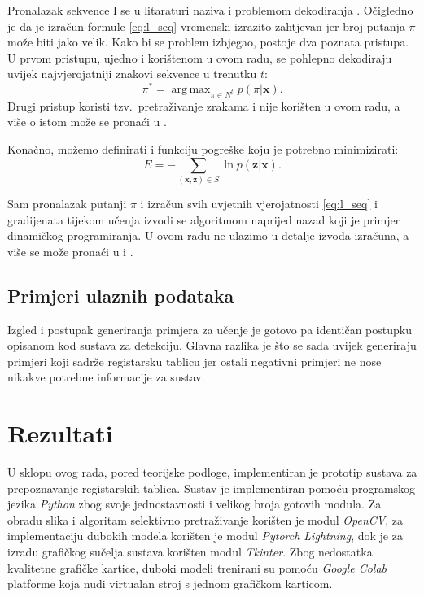 \documentclass[times, utf8, diplomski]{fer}
\DeclareMathOperator*{\argmax}{arg\,max}
\begin{document}
Pronalazak sekvence $\pmb{\mathbf{l}}$ se u litaraturi \citep{ctc-paper} naziva i problemom dekodiranja . Očigledno je da je izračun formule \ref{eq:l_seq} vremenski izrazito zahtjevan jer broj putanja $\pi$ može biti jako velik. Kako bi se problem izbjegao, postoje dva poznata pristupa. U prvom pristupu, ujedno i korištenom u ovom radu, se pohlepno dekodiraju uvijek najvjerojatniji znakovi sekvence  u trenutku $t$:
\begin{equation}
    \pi^* = \argmax_{\pi \in N^t}p(\pi | \pmb{\mathbf{x}}).
\end{equation}
Drugi pristup koristi tzv.\ pretraživanje zrakama  i nije korišten u ovom radu, a više o istom može se pronaći u \citep{ctc-paper}.

Konačno, možemo definirati i funkciju pogreške koju je potrebno minimizirati:
\begin{equation}
    E = - \sum_{(\pmb{\mathbf{x}}, \pmb{\mathbf{z}}) \in S} \ln p(\pmb{\mathbf{z}}|\pmb{\mathbf{x}}).
\end{equation}

Sam pronalazak putanji $\pi$ i izračun svih uvjetnih vjerojatnosti \ref{eq:l_seq} i gradijenata tijekom učenja izvodi se algoritmom naprijed nazad  koji je primjer dinamičkog programiranja. U ovom radu ne ulazimo u detalje izvoda izračuna, a više se može pronaći u \citep{ctc-paper} i \citep{crnn-paper}. 

\section{Primjeri ulaznih podataka}
Izgled i postupak generiranja primjera za učenje je gotovo pa identičan postupku opisanom kod sustava za detekciju. Glavna razlika je što se sada uvijek generiraju primjeri koji sadrže registarsku tablicu jer ostali negativni primjeri ne nose nikakve potrebne informacije za sustav.


\chapter{Rezultati}
U sklopu ovog rada, pored teorijske podloge, implementiran je prototip sustava za prepoznavanje registarskih tablica. Sustav je implementiran pomoću programskog jezika \textit{Python} zbog svoje jednostavnosti i velikog broja gotovih modula. Za obradu slika i algoritam selektivno pretraživanje korišten je modul \textit{OpenCV}, za implementaciju dubokih modela korišten je modul \textit{Pytorch Lightning}, dok je za izradu grafičkog sučelja sustava korišten modul \textit{Tkinter}. Zbog nedostatka kvalitetne grafičke kartice, duboki modeli trenirani su pomoću \textit{Google Colab} platforme koja nudi virtualan stroj s jednom grafičkom karticom.
\end{document}
